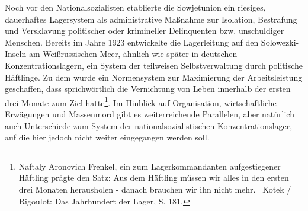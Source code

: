 \documentclass[a4paper,12pt,ngerman,
]{nisebook}
\begin{document}
Noch vor den Nationalsozialisten etablierte die Sowjetunion ein riesiges, dauerhaftes Lagersystem als administrative Maßnahme zur Isolation, Bestrafung und Versklavung politischer oder krimineller Delinquenten bzw. unschuldiger Menschen. Bereits im Jahre 1923 entwickelte die Lagerleitung auf den Solowezki-Inseln am Weißrussischen Meer, ähnlich wie später in deutschen Konzentrationslagern, ein System der teilweisen Selbstverwaltung durch politische Häftlinge. Zu dem wurde ein Normensystem zur Maximierung der Arbeitsleistung geschaffen, dass sprichwörtlich die Vernichtung von Leben innerhalb der ersten drei Monate zum Ziel hatte\footnote{Naftaly Aronovich Frenkel, ein zum Lagerkommandanten aufgestiegener Häftling prägte den Satz: \glqq Aus dem Häftling müssen wir alles in den ersten drei Monaten herausholen - danach brauchen wir ihn nicht mehr.\grqq~ Kotek / Rigoulot: Das Jahrhundert der Lager, S. 181.}. Im Hinblick auf  Organisation, wirtschaftliche Erwägungen und Massenmord gibt es weiterreichende Parallelen, aber natürlich auch Unterschiede zum System der nationalsozialistischen Konzentrationslager, auf die hier jedoch nicht weiter eingegangen werden soll.
\end{document}
